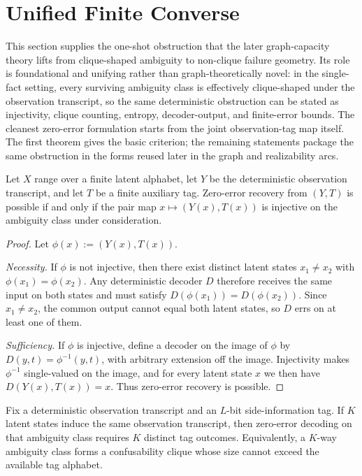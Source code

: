 \section{Unified Finite Converse}\label{sec:converse}


This section supplies the one-shot obstruction that the later graph-capacity theory lifts from clique-shaped ambiguity to non-clique failure geometry. Its role is foundational and unifying rather than graph-theoretically novel: in the single-fact setting, every surviving ambiguity class is effectively clique-shaped under the observation transcript, so the same deterministic obstruction can be stated as injectivity, clique counting, entropy, decoder-output, and finite-error bounds. The cleanest zero-error formulation starts from the joint observation-tag map itself. The first theorem gives the basic criterion; the remaining statements package the same obstruction in the forms reused later in the graph and realizability arcs.

\begin{theorem}\label{thm:pair-injective}
Let $X$ range over a finite latent alphabet, let $Y$ be the deterministic observation transcript, and let $T$ be a finite auxiliary tag. Zero-error recovery from $(Y,T)$ is possible if and only if the pair map $x \mapsto (Y(x),T(x))$ is injective on the ambiguity class under consideration.
\end{theorem}

\begin{proof}
Let $\phi(x):=(Y(x),T(x))$.

\emph{Necessity.} If $\phi$ is not injective, then there exist distinct latent states $x_1\neq x_2$ with $\phi(x_1)=\phi(x_2)$. Any deterministic decoder $D$ therefore receives the same input on both states and must satisfy $D(\phi(x_1))=D(\phi(x_2))$. Since $x_1\neq x_2$, the common output cannot equal both latent states, so $D$ errs on at least one of them.

\emph{Sufficiency.} If $\phi$ is injective, define a decoder on the image of $\phi$ by $D(y,t)=\phi^{-1}(y,t)$, with arbitrary extension off the image. Injectivity makes $\phi^{-1}$ single-valued on the image, and for every latent state $x$ we then have $D(Y(x),T(x))=x$. Thus zero-error recovery is possible.
\end{proof}

\begin{theorem}\label{thm:confusability-converse}
Fix a deterministic observation transcript and an $L$-bit side-information tag. If $K$ latent states induce the same observation transcript, then zero-error decoding on that ambiguity class requires $K$ distinct tag outcomes. Equivalently, a $K$-way ambiguity class forms a confusability clique whose size cannot exceed the available tag alphabet.
\end{theorem}

